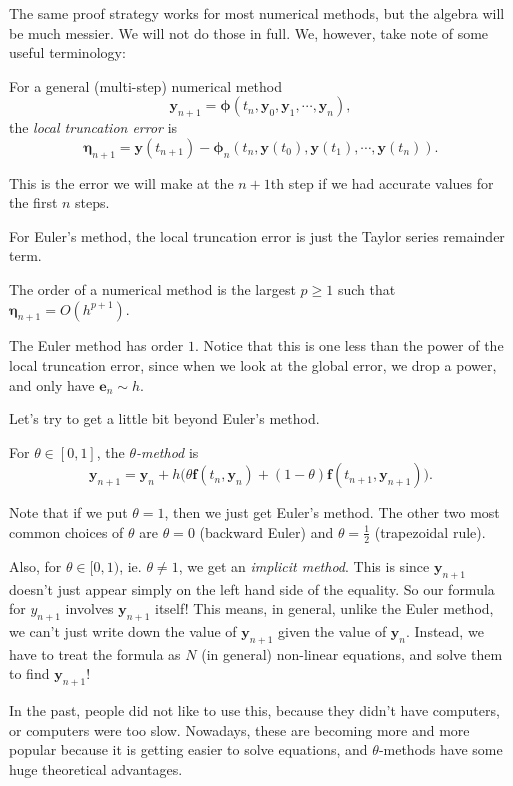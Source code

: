 \documentclass[a4paper]{article}
\begin{document}
The same proof strategy works for most numerical methods, but the algebra will be much messier. We will not do those in full. We, however, take note of some useful terminology:
\begin{defi}
  For a general (multi-step) numerical method
  \[
    \mathbf{y}_{n + 1} = \boldsymbol\phi (t_n, \mathbf{y}_0, \mathbf{y}_1, \cdots,\mathbf{y}_n),
  \]
  the \emph{local truncation error} is
  \[
    \boldsymbol\eta_{n + 1} = \mathbf{y}(t_{n + 1}) - \boldsymbol\phi_n(t_n, \mathbf{y}(t_0), \mathbf{y}(t_1), \cdots, \mathbf{y}(t_n)).
  \]
\end{defi}
This is the error we will make at the $n + 1$th step if we had accurate values for the first $n$ steps.

For Euler's method, the local truncation error is just the Taylor series remainder term.

\begin{defi}[Order]
  The order of a numerical method is the largest $p \geq 1$ such that $\boldsymbol\eta_{n + 1} = O(h^{p + 1})$.
\end{defi}
The Euler method has order $1$. Notice that this is one less than the power of the local truncation error, since when we look at the global error, we drop a power, and only have $\mathbf{e}_n \sim h$.

Let's try to get a little bit beyond Euler's method.
\begin{defi}
  For $\theta \in [0, 1]$, the \emph{$\theta$-method} is
  \[
    \mathbf{y}_{n + 1} = \mathbf{y}_n + h\Big( \theta \mathbf{f}(t_n, \mathbf{y}_n) + (1 - \theta) \mathbf{f}(t_{n + 1}, \mathbf{y}_{n + 1})\Big).
  \]
\end{defi}
Note that if we put $\theta = 1$, then we just get Euler's method. The other two most common choices of $\theta$ are $\theta = 0$ (backward Euler) and $\theta = \frac{1}2$ (trapezoidal rule).

Also, for $\theta \in [0, 1)$, ie. $\theta \not= 1$, we get an \emph{implicit method}. This is since $\mathbf{y}_{n + 1}$ doesn't just appear simply on the left hand side of the equality. So our formula for $y_{n + 1}$ involves $\mathbf{y}_{n + 1}$ itself! This means, in general, unlike the Euler method, we can't just write down the value of $\mathbf{y}_{n + 1}$ given the value of $\mathbf{y}_n$. Instead, we have to treat the formula as $N$ (in general) non-linear equations, and solve them to find $\mathbf{y}_{n + 1}$!

In the past, people did not like to use this, because they didn't have computers, or computers were too slow. Nowadays, these are becoming more and more popular because it is getting easier to solve equations, and $\theta$-methods have some huge theoretical advantages.
\end{document}
